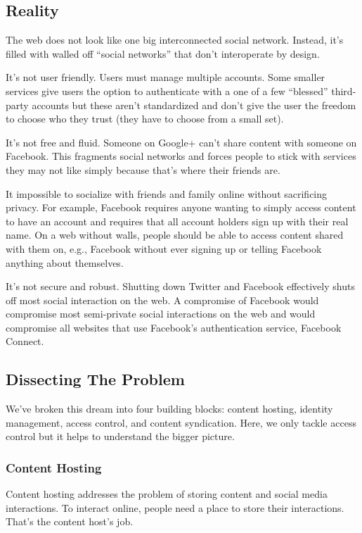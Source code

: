 \documentclass[pdftex,12pt,a4papaer,twoside,notitlepage]{report}
\begin{document}
\subsection{Reality}

The web does not look like one big interconnected social network. Instead, it's
filled with walled off ``social networks'' that don't interoperate by design.

It's not user friendly. Users must manage multiple accounts. Some smaller
services give users the option to authenticate with a one of a few ``blessed''
third-party accounts but these aren't standardized and don't give the user the
freedom to choose who they trust (they have to choose from a small set).

It's not free and fluid. Someone on Google+ can't share content with someone on
Facebook. This fragments social networks and forces people to stick with
services they may not like simply because that's where their friends are.

It impossible to socialize with friends and family online without sacrificing
privacy. For example, Facebook requires anyone wanting to simply access content
to have an account and requires that all account holders sign up with their real
name. On a web without walls, people should be able to access content shared
with them on, e.g., Facebook without ever signing up or telling Facebook
anything about themselves.

It's not secure and robust. Shutting down Twitter and Facebook effectively shuts
off most social interaction on the web. A compromise of Facebook would
compromise most semi-private social interactions on the web and would compromise
all websites that use Facebook's authentication service, Facebook Connect.

\subsection{Dissecting The Problem}

We've broken this dream into four building blocks: content hosting, identity
management, access control, and content syndication. Here, we only tackle access
control but it helps to understand the bigger picture.

\subsubsection{Content Hosting}

Content hosting addresses the problem of storing content and social media
interactions. To interact online, people need a place to store their
interactions. That's the content host's job.
\end{document}
